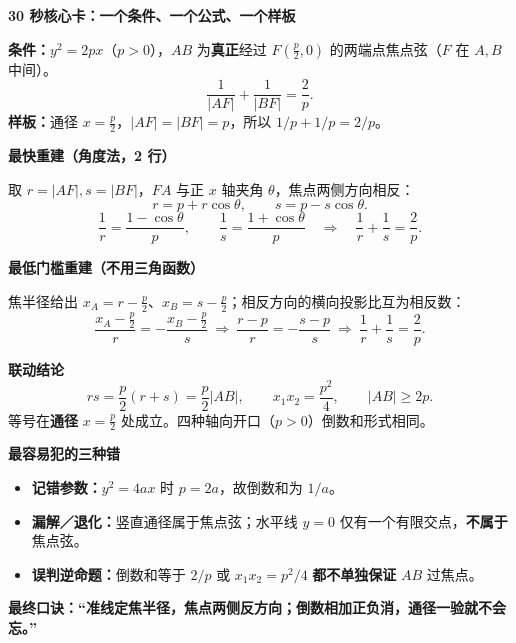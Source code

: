\clearpage
\begin{summarybox}
\textbf{\textcolor{CSummary}{30 秒核心卡：一个条件、一个公式、一个样板}}

\textbf{条件：}$y^2=2px$（$p>0$），$AB$ 为\textbf{真正}经过 $F(\frac p2,0)$ 的两端点焦点弦（$F$ 在 $A,B$ 中间）。
\[
 \boxed{\frac1{|AF|}+\frac1{|BF|}=\frac2p}.
\]
\textbf{样板：}通径 $x=\frac p2$，$|AF|=|BF|=p$，所以 $1/p+1/p=2/p$。

\medskip
\textbf{\textcolor{CSummary}{最快重建（角度法，2 行）}}

取 $r=|AF|,s=|BF|$，$FA$ 与正 $x$ 轴夹角 $\theta$，焦点两侧方向相反：
\[
 r=p+r\cos\theta,\qquad s=p-s\cos\theta.
\]
\[
 \frac1r=\frac{1-\cos\theta}p,\qquad
 \frac1s=\frac{1+\cos\theta}p\quad\Longrightarrow\quad\frac1r+\frac1s=\frac2p.
\]

\medskip
\textbf{\textcolor{CSummary}{最低门槛重建（不用三角函数）}}

焦半径给出 $x_A=r-\frac p2$、$x_B=s-\frac p2$；相反方向的横向投影比互为相反数：
\[
 \frac{x_A-\frac p2}r=-\frac{x_B-\frac p2}s
 \ \Longrightarrow\ \frac{r-p}r=-\frac{s-p}s
 \ \Longrightarrow\ \boxed{\frac1r+\frac1s=\frac2p}.
\]

\medskip
\textbf{\textcolor{CSummary}{联动结论}}
\[
 rs=\frac p2(r+s)=\frac p2|AB|,\qquad
 x_1x_2=\frac{p^2}{4},\qquad |AB|\ge2p.
\]
等号在\textbf{通径} $x=\frac p2$ 处成立。四种轴向开口（$p>0$）倒数和形式相同。

\medskip
\textbf{\textcolor{CSummary}{最容易犯的三种错}}
\begin{itemize}[leftmargin=*,itemsep=0.35em]
 \item \textbf{记错参数：}$y^2=4ax$ 时 $p=2a$，故倒数和为 $1/a$。
 \item \textbf{漏解／退化：}竖直通径属于焦点弦；水平线 $y=0$ 仅有一个有限交点，\textbf{不属于}焦点弦。
 \item \textbf{误判逆命题：}倒数和等于 $2/p$ 或 $x_1x_2=p^2/4$ \textbf{都不单独保证} $AB$ 过焦点。
\end{itemize}

\textbf{最终口诀：}\textbf{“准线定焦半径，焦点两侧反方向；倒数相加正负消，通径一验就不会忘。”}
\end{summarybox}
